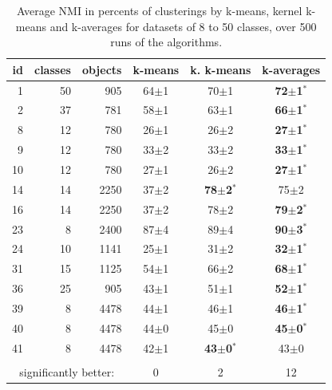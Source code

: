 \documentclass[twoside,11pt]{article}
\begin{document}
 
 
   
\begin{table} 
\begin{center} 
\caption{Average NMI in percents of clusterings by k-means, kernel k-means and k-averages for datasets of 8 to 50 classes, over 500 runs of the algorithms.}
\label{tab:results-8}
\begin{tabular}{rrrccc} 
id & classes & objects & k-means & k. k-means & k-averages \\ 
\hline 
 1 & 50 &  905 & 64$\pm$1 & 70$\pm$1 & \textbf{72$\pm$1$^*$} \\ 
 2 & 37 &  781 & 58$\pm$1 & 63$\pm$1 & \textbf{66$\pm$1$^*$} \\ 
 8 & 12 &  780 & 26$\pm$1 & 26$\pm$2 & \textbf{27$\pm$1$^*$} \\ 
 9 & 12 &  780 & 33$\pm$2 & 33$\pm$2 & \textbf{33$\pm$1$^*$} \\ 
10 & 12 &  780 & 27$\pm$1 & 26$\pm$2 & \textbf{27$\pm$1$^*$} \\ 
14 & 14 & 2250 & 37$\pm$2 & \textbf{78$\pm$2$^*$} & 75$\pm$2 \\ 
16 & 14 & 2250 & 37$\pm$2 & 78$\pm$2 & \textbf{79$\pm$2$^*$} \\ 
23 &  8 & 2400 & 87$\pm$4 & 89$\pm$4 & \textbf{90$\pm$3$^*$} \\ 
24 & 10 & 1141 & 25$\pm$1 & 31$\pm$2 & \textbf{32$\pm$1$^*$} \\ 
31 & 15 & 1125 & 54$\pm$1 & 66$\pm$2 & \textbf{68$\pm$1$^*$} \\ 
36 & 25 &  905 & 43$\pm$1 & 51$\pm$1 & \textbf{52$\pm$1$^*$} \\ 
39 &  8 & 4478 & 44$\pm$1 & 46$\pm$1 & \textbf{46$\pm$1$^*$} \\ 
40 &  8 & 4478 & 44$\pm$0 & 45$\pm$0 & \textbf{45$\pm$0$^*$} \\ 
41 &  8 & 4478 & 42$\pm$1 & \textbf{43$\pm$0$^*$} & 43$\pm$0 \\ 
\hline 
\vspace{-.2cm} \\
\multicolumn{3}{c}{significantly better:}  & 0 & 2 & 12 \\ 
\end{tabular} 
\end{center} 
\end{table} 
 
\end{document}
